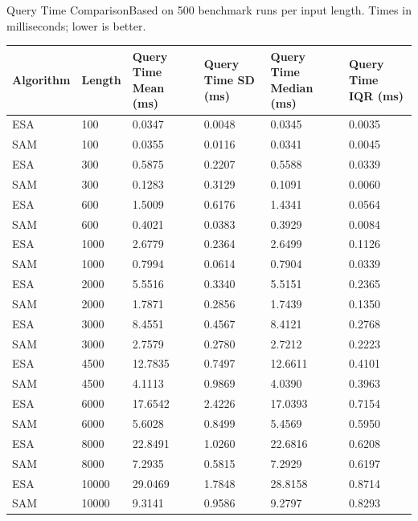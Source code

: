 \begin{benchmarktable}{Query Time Comparison}{Based on 500 benchmark runs per input length. Times in milliseconds; lower is better.}
\begin{tabularx}{\textwidth}{|X|X|X|X|X|X|}
\toprule
Algorithm & Length & Query Time Mean (ms) & Query Time SD (ms) & Query Time Median (ms) & Query Time IQR (ms) \\
\midrule
ESA & 100 & 0.0347 & 0.0048 & 0.0345 & 0.0035 \\
SAM & 100 & 0.0355 & 0.0116 & 0.0341 & 0.0045 \\
\hline
ESA & 300 & 0.5875 & 0.2207 & 0.5588 & 0.0339 \\
SAM & 300 & 0.1283 & 0.3129 & 0.1091 & 0.0060 \\
\hline
ESA & 600 & 1.5009 & 0.6176 & 1.4341 & 0.0564 \\
SAM & 600 & 0.4021 & 0.0383 & 0.3929 & 0.0084 \\
\hline
ESA & 1000 & 2.6779 & 0.2364 & 2.6499 & 0.1126 \\
SAM & 1000 & 0.7994 & 0.0614 & 0.7904 & 0.0339 \\
\hline
ESA & 2000 & 5.5516 & 0.3340 & 5.5151 & 0.2365 \\
SAM & 2000 & 1.7871 & 0.2856 & 1.7439 & 0.1350 \\
\hline
ESA & 3000 & 8.4551 & 0.4567 & 8.4121 & 0.2768 \\
SAM & 3000 & 2.7579 & 0.2780 & 2.7212 & 0.2223 \\
\hline
ESA & 4500 & 12.7835 & 0.7497 & 12.6611 & 0.4101 \\
SAM & 4500 & 4.1113 & 0.9869 & 4.0390 & 0.3963 \\
\hline
ESA & 6000 & 17.6542 & 2.4226 & 17.0393 & 0.7154 \\
SAM & 6000 & 5.6028 & 0.8499 & 5.4569 & 0.5950 \\
\hline
ESA & 8000 & 22.8491 & 1.0260 & 22.6816 & 0.6208 \\
SAM & 8000 & 7.2935 & 0.5815 & 7.2929 & 0.6197 \\
\hline
ESA & 10000 & 29.0469 & 1.7848 & 28.8158 & 0.8714 \\
SAM & 10000 & 9.3141 & 0.9586 & 9.2797 & 0.8293 \\
\bottomrule
\end{tabularx}
\end{benchmarktable}

